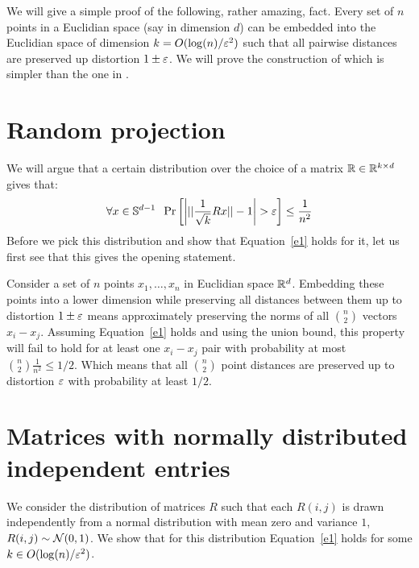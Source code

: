 \documentclass{article}
\begin{document}

We will give a simple proof of the following, rather amazing, fact. Every set of $n$ points 
in a Euclidian space (say in dimension $d$) can be embedded into the Euclidian space of 
dimension $k = O(\log(n)/\varepsilon^2)$ such that all pairwise distances are preserved up distortion $1\pm \varepsilon$.
We will prove the construction of \cite{DasGuptaGupta99} which is simpler than the one in \cite{JL84}.

\section*{Random projection}
We will argue that a certain distribution over the choice of a matrix ${\mathbb{R}} \in {\mathbb{R}}^{k \times d}$ gives that:
\begin{equation}
\label{e1}
\forall x \in {\mathbb{S}}^{d-1} \;\; \Pr\left[ \left| ||\frac{1}{\sqrt{k}}Rx|| - 1 \right| > \varepsilon \right] \le \frac{1}{n^2} 
\end{equation}
Before we pick this distribution and show that Equation~\ref{e1} holds for it, let us first see
that this gives the opening statement. 

Consider a set of $n$ points $x_1,\ldots, x_n$ in Euclidian space ${\mathbb{R}}^d$. Embedding these points
into a lower dimension while preserving all distances between
them up to distortion $1\pm \varepsilon$ means approximately preserving the norms of all 
${n \choose 2}$ vectors $x_i - x_j$. Assuming Equation~\ref{e1} holds and using the union 
bound, this property will fail to hold for at least one $x_i - x_j$ pair with probability at most ${n \choose 2}\frac{1}{n^2} \le 1/2$.
Which means that all ${n \choose 2}$ point distances are preserved up to distortion $\varepsilon$ with probability at least $1/2$.


\section{Matrices with normally distributed independent entries}
We consider the distribution of matrices $R$ such that each $R(i,j)$ is drawn independently from  a
normal distribution with mean zero and variance $1$, $R(i,j) \sim {\mathcal{N}}(0,1)$. We show that for this
distribution Equation~\ref{e1} holds for some $k \in O(\log(n)/\varepsilon^2)$.
\end{document}
